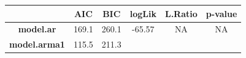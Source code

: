 \documentclass[]{article}
\begin{document}
\begin{longtable}[]{@{}cccccc@{}}
\toprule
\begin{minipage}[b]{0.21\columnwidth}\centering\strut
~\strut
\end{minipage} & \begin{minipage}[b]{0.07\columnwidth}\centering\strut
AIC\strut
\end{minipage} & \begin{minipage}[b]{0.07\columnwidth}\centering\strut
BIC\strut
\end{minipage} & \begin{minipage}[b]{0.10\columnwidth}\centering\strut
logLik\strut
\end{minipage} & \begin{minipage}[b]{0.12\columnwidth}\centering\strut
L.Ratio\strut
\end{minipage} & \begin{minipage}[b]{0.12\columnwidth}\centering\strut
p-value\strut
\end{minipage}\tabularnewline
\midrule
\endhead
\begin{minipage}[t]{0.21\columnwidth}\centering\strut
\textbf{model.ar}\strut
\end{minipage} & \begin{minipage}[t]{0.07\columnwidth}\centering\strut
169.1\strut
\end{minipage} & \begin{minipage}[t]{0.07\columnwidth}\centering\strut
260.1\strut
\end{minipage} & \begin{minipage}[t]{0.10\columnwidth}\centering\strut
-65.57\strut
\end{minipage} & \begin{minipage}[t]{0.12\columnwidth}\centering\strut
NA\strut
\end{minipage} & \begin{minipage}[t]{0.12\columnwidth}\centering\strut
NA\strut
\end{minipage}\tabularnewline
\begin{minipage}[t]{0.21\columnwidth}\centering\strut
\textbf{model.arma1}\strut
\end{minipage} & \begin{minipage}[t]{0.07\columnwidth}\centering\strut
115.5\strut
\end{minipage} & \begin{minipage}[t]{0.07\columnwidth}\centering\strut
211.3\strut
\end{minipage} & \begin{minipage}[t]{0.10\columnwidth}\centering\strut

\end{minipage}
\end{longtable}
\end{document}
